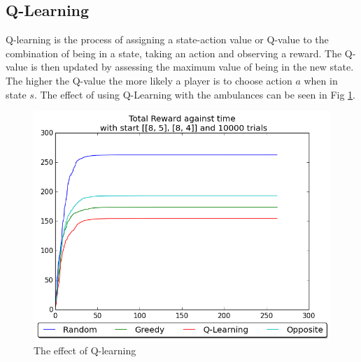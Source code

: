 \documentclass[a0,landscape]{a0poster}
\begin{document}
\begin{multicols}{3}
\section*{Q-Learning}
Q-learning is the process of assigning a state-action value or Q-value to the combination of being in a state, taking an action and observing a reward.
The Q-value is then updated by assessing the maximum value of being in the new state.
The higher the Q-value the more likely a player is to choose action $a$ when in state $s$.
The effect of using Q-Learning with the ambulances can be seen in Fig \ref{fig:q_learning}.

\begin{figure}[H]
\centering
\includegraphics[width=0.4\linewidth]{Images/q_learning.png}
\caption{The effect of Q-learning}
\label{fig:q_learning}
\end{figure}

\end{multicols}
\end{document}
